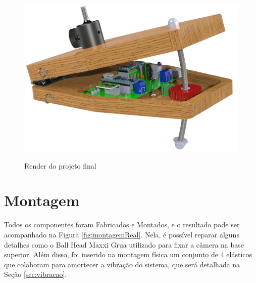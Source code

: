 \begin{figure}[!htb]
	\centering
	\caption{Render do projeto final}
	\includegraphics[width=.95\linewidth]{figuras/desPlataforma/renderEasyTracker}
	\label{fig:renderEasyTracker}
\end{figure}

\section{Montagem}

Todos os componentes foram Fabricados e Montados, e o resultado pode ser acompanhado na Figura \ref{fig:montagemReal}. Nela, é possível reparar alguns detalhes como o Ball Head Maxxi Grua utilizado para fixar a câmera na base superior. Além disso, foi inserido na montagem física um conjunto de 4 elásticos que colaboram para amortecer a vibração do sistema, que será detalhada na Seção \ref{sec:vibracao}.


